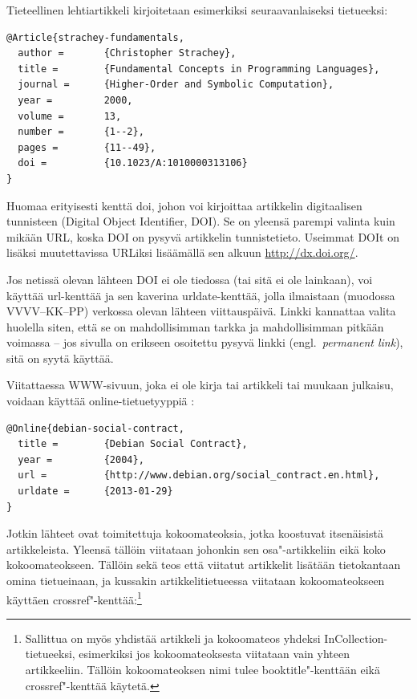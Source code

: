 \documentclass[utf8]{gradu3}
\begin{document}
Tieteellinen lehtiartikkeli \parencite[esim.][]{strachey-fundamentals}
kirjoitetaan esimerkiksi seuraavanlaiseksi tietueeksi:

\begingroup\footnotesize
\begin{verbatim}
@Article{strachey-fundamentals,
  author =       {Christopher Strachey},
  title =        {Fundamental Concepts in Programming Languages},
  journal =      {Higher-Order and Symbolic Computation},
  year =         2000,
  volume =       13,
  number =       {1--2},
  pages =        {11--49},
  doi =          {10.1023/A:1010000313106}
}
\end{verbatim}
\endgroup

Huomaa erityisesti kenttä doi, johon voi kirjoittaa artikkelin
digitaalisen tunnisteen (Digital Object Identifier, DOI).  Se on
yleensä parempi valinta kuin mikään URL, koska DOI on pysyvä
artikkelin tunnistetieto.  Useimmat DOIt on lisäksi muutettavissa
URLiksi lisäämällä sen alkuun \url{http://dx.doi.org/}.

Jos netissä olevan lähteen DOI ei ole tiedossa (tai sitä ei ole
lainkaan), voi käyttää url-kenttää ja sen kaverina urldate-kenttää,
jolla ilmaistaan (muodossa VVVV--KK--PP) verkossa olevan lähteen
viittauspäivä.  Linkki kannattaa valita huolella siten, että se on
mahdollisimman tarkka ja mahdollisimman pitkään voimassa -- jos
sivulla on erikseen osoitettu pysyvä linkki (engl.~\emph{permanent
  link}), sitä on syytä käyttää.

Viitattaessa WWW-sivuun, joka ei ole kirja tai artikkeli tai muukaan
julkaisu, voidaan käyttää
online-tietuetyyppiä \parencite[esim.][]{debian-social-contract}:

\begingroup\footnotesize
\begin{verbatim}
@Online{debian-social-contract,
  title =        {Debian Social Contract},
  year =         {2004},
  url =          {http://www.debian.org/social_contract.en.html},
  urldate =      {2013-01-29}
}
\end{verbatim}
\endgroup

Jotkin lähteet ovat toimitettuja kokoomateoksia, jotka koostuvat
itsenäisistä artikkeleista.  Yleensä tällöin viitataan johonkin sen
osa"-artikkeliin \parencite[esim.][]{prechelt-credibility} eikä koko
kokoomateokseen.  Tällöin sekä teos että viitatut artikkelit lisätään
tietokantaan omina tietueinaan, ja kussakin artikkelitietueessa
viitataan kokoomateokseen käyttäen
crossref"-kenttää:\footnote{Sallittua on myös yhdistää artikkeli ja
  kokoomateos yhdeksi InCollection-tietueeksi, esimerkiksi jos
  kokoomateoksesta viitataan vain yhteen artikkeeliin.  Tällöin
  kokoomateoksen nimi tulee booktitle"-kenttään eikä crossref"-kenttää
  käytetä.}
\end{document}
